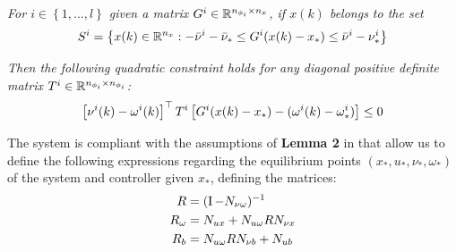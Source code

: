 \documentclass{article}
\begin{document}
\emph{For $i \in \left\{ 1, \dots, l \right\}$ given a matrix $G^i \in {\mathbb{R}}^{n_{\phi_i} \times n_x}$, if $x(k)$ belongs to the set}
$$
S^i = \left\{ x(k) \in {\mathbb{R}}^{n_x} : -\bar{\nu}^i - \bar{\nu}_* \leq G^i (x(k) - x_*) \leq \bar{\nu}^i - \nu_*^i \right\} 
$$

\emph{Then the following quadratic constraint holds for any diagonal positive definite matrix $T^i \in {\mathbb{R}}^{n_{\phi_i} \times n_{\phi_i}}$:}
\begin{equation}\label{eqn:first_sec_cond}
  \left[ \nu^i(k) - \omega^i(k) \right]^\top T^i \left[ G^i (x(k) - x_*) - (\omega^i(k) - \omega^i_*) \right] \leq 0
\end{equation}

The system is compliant with the assumptions of \textbf{Lemma 2} in \cite{css-extended} that allow us to define the following expressions regarding the equilibrium points $\left( x_*, u_*, \nu_*, \omega_* \right)$ of the system and controller given $x_*$, defining the matrices:
\begin{equation}
    \begin{aligned}
         R &= (\operatorname{I} - N_{\nu \omega})^{-1}\\
         R_{\omega} &= N_{u x} + N_{u \omega} R N_{\nu x}\\
         R_b &= N_{u \omega} R N_{\nu b} + N_{u b}
    \end{aligned}
\end{equation}
\end{document}
